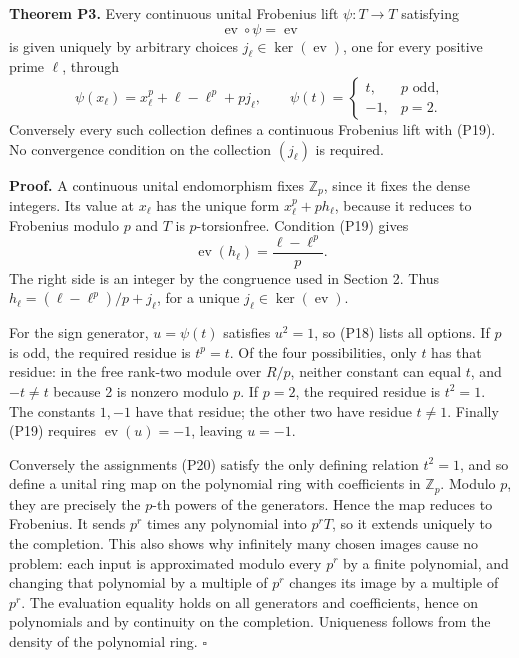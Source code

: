 \documentclass[
]{article}
\begin{document}
\textbf{Theorem P3.} Every continuous unital Frobenius lift
\(\psi:T\to T\) satisfying \[
\operatorname{ev}\circ\psi=\operatorname{ev}
\tag{P19}
\] is given uniquely by arbitrary choices
\(j_\ell\in\ker(\operatorname{ev})\), one for every positive prime
\(\ell\), through \[
\psi(x_\ell)=x_\ell^p+\ell-\ell^p+p j_\ell,
\qquad
\psi(t)=
\begin{cases}
t,&p\text{ odd},\\
-1,&p=2.
\end{cases}
\tag{P20}
\] Conversely every such collection defines a continuous Frobenius lift
with (P19). No convergence condition on the collection \((j_\ell)\) is
required.

\textbf{Proof.} A continuous unital endomorphism fixes \(\mathbb Z_p\),
since it fixes the dense integers. Its value at \(x_\ell\) has the
unique form \(x_\ell^p+p h_\ell\), because it reduces to Frobenius
modulo \(p\) and \(T\) is \(p\)-torsionfree. Condition (P19) gives \[
\operatorname{ev}(h_\ell)=\frac{\ell-\ell^p}{p}.
\] The right side is an integer by the congruence used in Section 2.
Thus \(h_\ell=(\ell-\ell^p)/p+j_\ell\), for a unique
\(j_\ell\in\ker(\operatorname{ev})\).

For the sign generator, \(u=\psi(t)\) satisfies \(u^2=1\), so (P18)
lists all options. If \(p\) is odd, the required residue is \(t^p=t\).
Of the four possibilities, only \(t\) has that residue: in the free
rank-two module over \(R/p\), neither constant can equal \(t\), and
\(-t\ne t\) because 2 is nonzero modulo \(p\). If \(p=2\), the required
residue is \(t^2=1\). The constants \(1,-1\) have that residue; the
other two have residue \(t\ne1\). Finally (P19) requires
\(\operatorname{ev}(u)=-1\), leaving \(u=-1\).

Conversely the assignments (P20) satisfy the only defining relation
\(t^2=1\), and so define a unital ring map on the polynomial ring with
coefficients in \(\mathbb Z_p\). Modulo \(p\), they are precisely the
\(p\)-th powers of the generators. Hence the map reduces to Frobenius.
It sends \(p^r\) times any polynomial into \(p^rT\), so it extends
uniquely to the completion. This also shows why infinitely many chosen
images cause no problem: each input is approximated modulo every \(p^r\)
by a finite polynomial, and changing that polynomial by a multiple of
\(p^r\) changes its image by a multiple of \(p^r\). The evaluation
equality holds on all generators and coefficients, hence on polynomials
and by continuity on the completion. Uniqueness follows from the density
of the polynomial ring. \(\square\)
\end{document}
